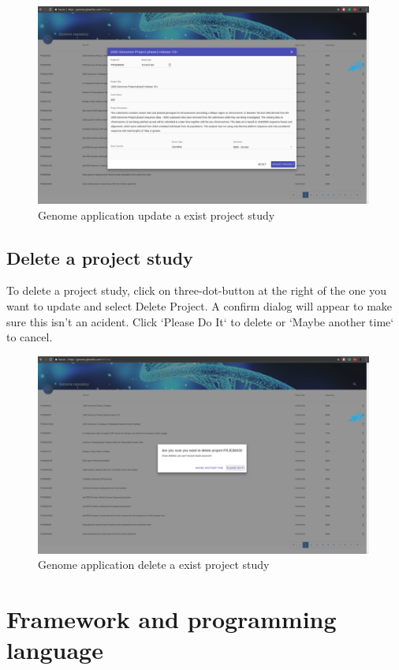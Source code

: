 \documentclass[a4paper,12pt]{article}
\begin{document}
\begin{figure}[H]
\centering
\includegraphics[width=0.99\textwidth]{images/genome-update}
\caption{Genome application update a exist project study}
\end{figure}

\subsection{Delete a project study}
To delete a project study, click on three-dot-button at the right of the one you want to update and select Delete Project. A confirm dialog will appear to make sure this isn't an acident. Click `Please Do It` to delete or `Maybe another time` to cancel.

\begin{figure}[H]
\centering
\includegraphics[width=0.99\textwidth]{images/genome-delete}
\caption{Genome application delete a exist project study}
\end{figure}

\section{Framework and programming language}
\end{document}
